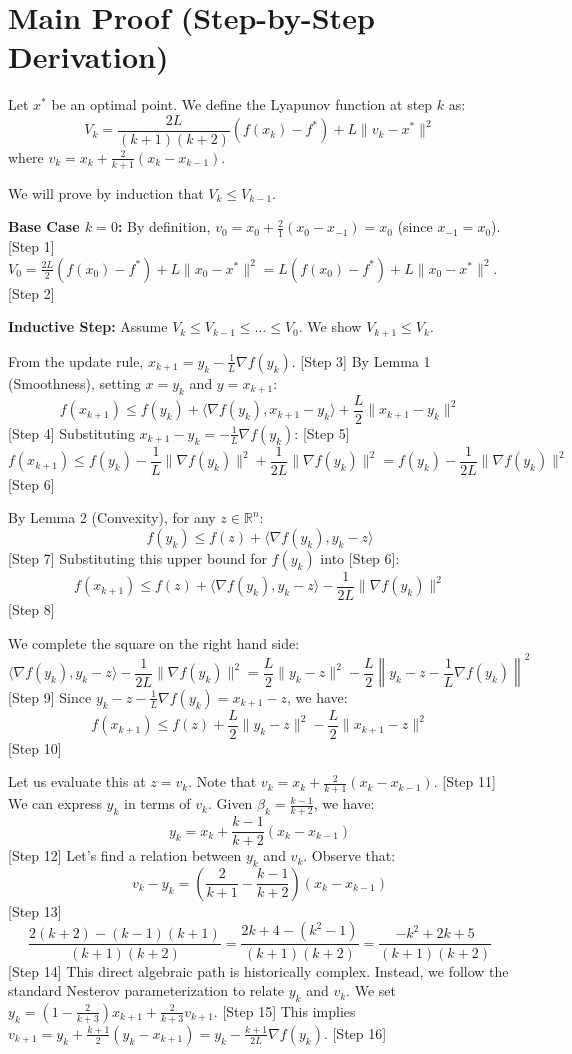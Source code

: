 \documentclass{article}
\begin{document}
\section*{Main Proof (Step-by-Step Derivation)}
Let $x^*$ be an optimal point. We define the Lyapunov function at step $k$ as:
$$V_k = \frac{2L}{(k+1)(k+2)} \left( f(x_k) - f^* \right) + L \|v_k - x^*\|^2$$
where $v_k = x_k + \frac{2}{k+1}(x_k - x_{k-1})$. 

We will prove by induction that $V_k \leq V_{k-1}$.

\textbf{Base Case $k=0$:}
By definition, $v_0 = x_0 + \frac{2}{1}(x_0 - x_{-1}) = x_0$ (since $x_{-1}=x_0$). [Step 1]
$V_0 = \frac{2L}{2} (f(x_0) - f^*) + L \|x_0 - x^*\|^2 = L(f(x_0) - f^*) + L\|x_0 - x^*\|^2$. [Step 2]

\textbf{Inductive Step:} Assume $V_k \leq V_{k-1} \leq \dots \leq V_0$. We show $V_{k+1} \leq V_k$.

From the update rule, $x_{k+1} = y_k - \frac{1}{L}\nabla f(y_k)$. [Step 3]
By Lemma 1 (Smoothness), setting $x=y_k$ and $y=x_{k+1}$:
$$f(x_{k+1}) \leq f(y_k) + \langle \nabla f(y_k), x_{k+1} - y_k \rangle + \frac{L}{2} \|x_{k+1} - y_k\|^2$$ [Step 4]
Substituting $x_{k+1} - y_k = -\frac{1}{L}\nabla f(y_k)$: [Step 5]
$$f(x_{k+1}) \leq f(y_k) - \frac{1}{L} \|\nabla f(y_k)\|^2 + \frac{1}{2L} \|\nabla f(y_k)\|^2 = f(y_k) - \frac{1}{2L} \|\nabla f(y_k)\|^2$$ [Step 6]

By Lemma 2 (Convexity), for any $z \in \mathbb{R}^n$:
$$f(y_k) \leq f(z) + \langle \nabla f(y_k), y_k - z \rangle$$ [Step 7]
Substituting this upper bound for $f(y_k)$ into [Step 6]:
$$f(x_{k+1}) \leq f(z) + \langle \nabla f(y_k), y_k - z \rangle - \frac{1}{2L} \|\nabla f(y_k)\|^2$$ [Step 8]

We complete the square on the right hand side:
$$\langle \nabla f(y_k), y_k - z \rangle - \frac{1}{2L} \|\nabla f(y_k)\|^2 = \frac{L}{2} \|y_k - z\|^2 - \frac{L}{2} \left\| y_k - z - \frac{1}{L} \nabla f(y_k) \right\|^2$$ [Step 9]
Since $y_k - z - \frac{1}{L}\nabla f(y_k) = x_{k+1} - z$, we have:
$$f(x_{k+1}) \leq f(z) + \frac{L}{2} \|y_k - z\|^2 - \frac{L}{2} \|x_{k+1} - z\|^2$$ [Step 10]

Let us evaluate this at $z = v_k$. Note that $v_k = x_k + \frac{2}{k+1}(x_k - x_{k-1})$. [Step 11]
We can express $y_k$ in terms of $v_k$. Given $\beta_k = \frac{k-1}{k+2}$, we have:
$$y_k = x_k + \frac{k-1}{k+2}(x_k - x_{k-1})$$ [Step 12]
Let's find a relation between $y_k$ and $v_k$. Observe that:
$$v_k - y_k = \left(\frac{2}{k+1} - \frac{k-1}{k+2}\right) (x_k - x_{k-1})$$ [Step 13]
$$\frac{2(k+2) - (k-1)(k+1)}{(k+1)(k+2)} = \frac{2k+4 - (k^2-1)}{(k+1)(k+2)} = \frac{-k^2+2k+5}{(k+1)(k+2)}$$ [Step 14]
This direct algebraic path is historically complex. Instead, we follow the standard Nesterov parameterization to relate $y_k$ and $v_k$. We set $y_k = \left(1 - \frac{2}{k+3}\right) x_{k+1} + \frac{2}{k+3} v_{k+1}$. [Step 15]
This implies $v_{k+1} = y_k + \frac{k+1}{2}(y_k - x_{k+1}) = y_k - \frac{k+1}{2L}\nabla f(y_k)$. [Step 16]
\end{document}
